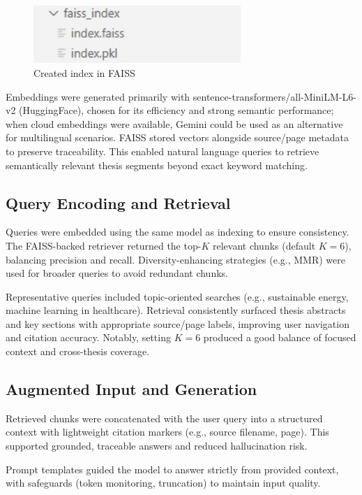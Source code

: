 \begin{refsection}
\begin{figure}[h]
    \centering
    \includegraphics[width=0.7\textwidth]{figures/index.jpg}
    \caption{Created index in FAISS}
\end{figure}

Embeddings were generated primarily with sentence-transformers/all-MiniLM-L6-v2 (HuggingFace), chosen for its efficiency and strong semantic performance; when cloud embeddings were available, Gemini could be used as an alternative for multilingual scenarios. FAISS stored vectors alongside source/page metadata to preserve traceability. This enabled natural language queries to retrieve semantically relevant thesis segments beyond exact keyword matching.

\subsection{Query Encoding and Retrieval}
Queries were embedded using the same model as indexing to ensure consistency. The FAISS-backed retriever returned the top-$K$ relevant chunks (default $K=6$), balancing precision and recall. Diversity-enhancing strategies (e.g., MMR) were used for broader queries to avoid redundant chunks.

Representative queries included topic-oriented searches (e.g., sustainable energy, machine learning in healthcare). Retrieval consistently surfaced thesis abstracts and key sections with appropriate source/page labels, improving user navigation and citation accuracy. Notably, setting $K=6$ produced a good balance of focused context and cross-thesis coverage.

\subsection{Augmented Input and Generation}
Retrieved chunks were concatenated with the user query into a structured context with lightweight citation markers (e.g., source filename, page). This supported grounded, traceable answers and reduced hallucination risk.

Prompt templates guided the model to answer strictly from provided context, with safeguards (token monitoring, truncation) to maintain input quality.


\end{refsection}
